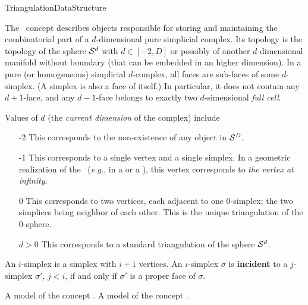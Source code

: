 \begin{ccRefConcept}{TriangulationDataStructure}

\ccDefinition

The \ccRefName\ concept describes objects responsible for storing and
maintaining the combinatorial part of a
$d$-dimensional pure simplicial complex. Its topology is the topology
of the sphere  $\mathcal S^d$ with $d\in[-2,D]$
or possibly of another $d$-dimensional manifold without boundary 
(that can be embedded in an higher dimension).
 In a  pure (or homogeneous) simplicial $d$-complex, all
 faces are sub-faces of some $d$-simplex. (A
simplex is also a face of itself.) In particular, it does not
contain any $d+1$-face, and any $d-1$-face belongs to exactly
two $d$-simensional {\em full cell}. 

Values of $d$ (the \emph{current dimension} of the complex) include \begin{itemize}

\item[-2] This corresponds to the non-existence of any object in
$\mathcal S^D.$

\item[-1] This corresponds to a single vertex and a single simplex. In a
geometric realization of the \ccRefName\ (\emph{e.g.}, in a
 or a
), this vertex
corresponds to \emph{the vertex at infinity}.

\item[0] This corresponds to two vertices, each adjacent to one $0$-simplex;
the two simplices being neighbor of each other. This is the unique
triangulation of the $0$-sphere.

\item[$d>0$] This corresponds to a standard triangulation of the sphere
$\mathcal S^d$.
\end{itemize}

An $i$-simplex is a simplex with $i+1$ vertices. An $i$-simplex $\sigma$ is
\textbf{incident} to a $j$-simplex $\sigma'$, $j<i$, if and only if $\sigma'$
is a proper face of $\sigma$. 

\ccHasModels


\ccTypes

{
A model of the concept .
}
\ccGlue
{}
{
A model of the concept .
}


\end{ccRefConcept}
